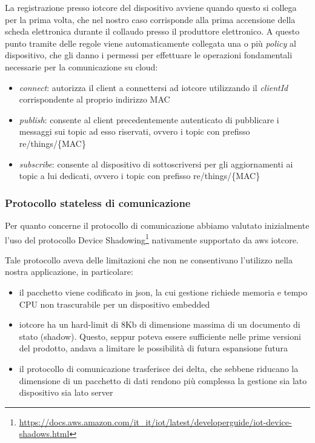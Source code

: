 \documentclass[12pt,a4paper,twoside,titlepage]{book}
\begin{document}
La registrazione presso \Gls{iotcore} del dispositivo avviene quando questo si collega per la prima 
volta, che nel nostro caso corrisponde alla prima accensione della scheda elettronica durante il collaudo 
presso il produttore elettronico. A questo punto tramite delle regole viene automaticamente collegata 
una o più \textit{policy} al dispositivo, che gli danno i permessi per effettuare le operazioni fondamentali 
necessarie per la comunicazione su \gls{cloud}:

\begin{itemize}
    \item \textit{connect}: autorizza il client a connettersi ad \Gls{iotcore} utilizzando il \textit{clientId}
        corrispondente al proprio indirizzo MAC
    \item \textit{publish}: consente al client precedentemente autenticato di pubblicare i messaggi sui topic ad 
        esso riservati, ovvero i \gls{topic} con prefisso \textrm{re/things/\{MAC\}}
    \item \textit{subscribe}: consente al dispositivo di sottoscriversi per gli aggiornamenti ai topic a lui dedicati, 
        ovvero i \gls{topic} con prefisso \textrm{re/things/\{MAC\}}
\end{itemize}

\subsubsection{Protocollo stateless di comunicazione}

Per quanto concerne il protocollo di comunicazione abbiamo valutato inizialmente
l'uso del protocollo Device Shadowing\footnote{\url{https://docs.aws.amazon.com/it\_it/iot/latest/developerguide/iot-device-shadows.html}}
nativamente supportato da \Gls{aws} \Gls{iotcore}.

Tale protocollo aveva delle limitazioni che non ne consentivano l'utilizzo nella nostra
applicazione, in particolare:

\begin{itemize}
    \item il pacchetto viene codificato in \acrshort{json}, la cui gestione richiede memoria
        e tempo CPU non trascurabile per un dispositivo embedded
    \item \Gls{iotcore} ha un hard-limit di 8Kb di dimensione massima di un documento di stato (shadow).
        Questo, seppur poteva essere sufficiente nelle prime versioni del prodotto, andava
        a limitare le possibilità di futura espansione futura
    \item il protocollo di comunicazione trasferisce dei delta, che sebbene riducano la
        dimensione di un pacchetto di dati rendono più complessa la gestione sia lato dispositivo 
        sia lato server
\end{itemize}
\end{document}
